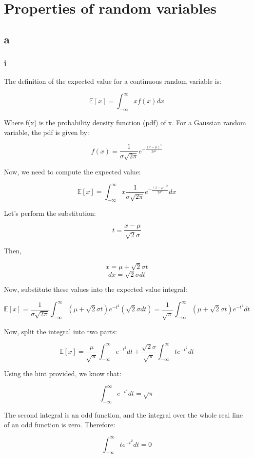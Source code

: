 \section{Properties of random variables}

\subsection{a}
\subsubsection{i}
The definition of the expected value for a continuous random variable is:

$$\mathbb{E}[x] = \int_{-\infty}^{\infty} x f(x) dx$$

Where f(x) is the probability density function (pdf) of x. For a Gaussian random variable, the pdf is given by:

$$f(x) = \frac{1}{\sigma\sqrt{2\pi}} e^{-\frac{(x-\mu)^2}{2\sigma^2}}$$

Now, we need to compute the expected value:

$$\mathbb{E}[x] = \int_{-\infty}^{\infty} x \frac{1}{\sigma\sqrt{2\pi}} e^{-\frac{(x-\mu)^2}{2\sigma^2}} dx$$

Let's perform the substitution:

$$t = \frac{x-\mu}{\sqrt{2}\sigma}$$

Then,

$$x = \mu + \sqrt{2}\sigma t$$
$$dx = \sqrt{2}\sigma dt$$

Now, substitute these values into the expected value integral:

$$\mathbb{E}[x] = \frac{1}{\sigma\sqrt{2\pi}} \int_{-\infty}^{\infty} (\mu + \sqrt{2}\sigma t) e^{-t^2} (\sqrt{2}\sigma dt) = \frac{1}{\sqrt{\pi}} \int_{-\infty}^{\infty} (\mu + \sqrt{2}\sigma t) e^{-t^2} dt$$

Now, split the integral into two parts:

$$\mathbb{E}[x] = \frac{\mu}{\sqrt{\pi}} \int_{-\infty}^{\infty} e^{-t^2} dt + \frac{\sqrt{2}\sigma}{\sqrt{\pi}} \int_{-\infty}^{\infty} te^{-t^2} dt$$

Using the hint provided, we know that:

$$\int_{-\infty}^{\infty} e^{-t^2} dt = \sqrt{\pi}$$

The second integral is an odd function, and the integral over the whole real line of an odd function is zero. Therefore:

$$\int_{-\infty}^{\infty} te^{-t^2} dt = 0$$

